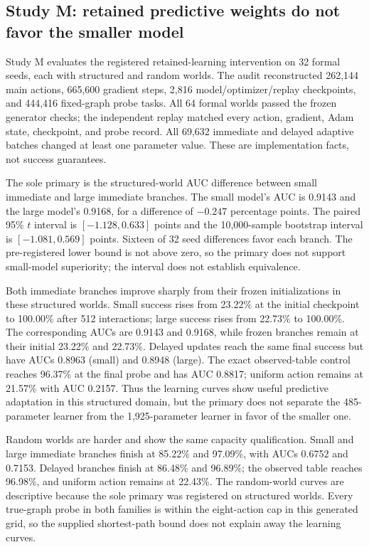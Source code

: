 \documentclass[11pt]{article}
\begin{document}
\subsection{Study M: retained predictive weights do not favor the smaller model}
Study M evaluates the registered retained-learning intervention on 32 formal
seeds, each with structured and random worlds. The audit reconstructed 262,144
main actions, 665,600 gradient steps, 2,816 model/optimizer/replay checkpoints,
and 444,416 fixed-graph probe tasks. All 64 formal worlds passed the frozen generator
checks; the independent replay matched every action, gradient, Adam state,
checkpoint, and probe record. All 69,632 immediate and delayed adaptive batches
changed at least one parameter value. These are implementation facts, not
success guarantees.

The sole primary is the structured-world AUC difference between small immediate
and large immediate branches. The small model's AUC is 0.9143 and the large
model's 0.9168, for a difference of $-0.247$ percentage points. The paired
95\% $t$ interval is $[-1.128,0.633]$ points and the 10,000-sample bootstrap
interval is $[-1.081,0.569]$ points. Sixteen of 32 seed differences favor each
branch. The pre-registered lower bound is not above zero, so the primary does
not support small-model superiority; the interval does not establish
equivalence.

Both immediate branches improve sharply from their frozen initializations in
these structured worlds. Small success rises from 23.22\% at the initial
checkpoint to 100.00\% after 512 interactions; large success rises from
22.73\% to 100.00\%. The corresponding AUCs are 0.9143 and 0.9168, while
frozen branches remain at their initial 23.22\% and 22.73\%. Delayed updates
reach the same final success but have AUCs 0.8963 (small) and 0.8948 (large).
The exact observed-table control reaches 96.37\% at the final probe and has
AUC 0.8817; uniform action remains at 21.57\% with AUC 0.2157. Thus the
learning curves show useful predictive adaptation in this structured domain,
but the primary does not separate the 485-parameter learner from the
1,925-parameter learner in favor of the smaller one.

Random worlds are harder and show the same capacity qualification. Small and
large immediate branches finish at 85.22\% and 97.09\%, with AUCs 0.6752 and
0.7153. Delayed branches finish at 86.48\% and 96.89\%; the observed table
reaches 96.98\%, and uniform action remains at 22.43\%. The random-world
curves are descriptive because the sole primary was registered on structured
worlds. Every true-graph probe in both families is within the eight-action cap
in this generated grid, so the supplied shortest-path bound does not explain
away the learning curves.
\end{document}
